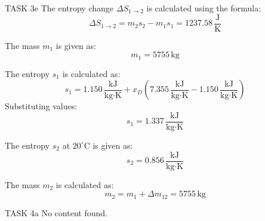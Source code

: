 TASK 3e  
The entropy change \( \Delta S_{1 \to 2} \) is calculated using the formula:  
\[
\Delta S_{1 \to 2} = m_2 s_2 - m_1 s_1 = 1237.58 \, \frac{\text{J}}{\text{K}}
\]

The mass \( m_1 \) is given as:  
\[
m_1 = 5755 \, \text{kg}
\]

The entropy \( s_1 \) is calculated as:  
\[
s_1 = 1.150 \, \frac{\text{kJ}}{\text{kg·K}} + x_D \left( 7.355 \, \frac{\text{kJ}}{\text{kg·K}} - 1.150 \, \frac{\text{kJ}}{\text{kg·K}} \right)
\]  
Substituting values:  
\[
s_1 = 1.337 \, \frac{\text{kJ}}{\text{kg·K}}
\]

The entropy \( s_2 \) at \( 20^\circ\text{C} \) is given as:  
\[
s_2 = 0.856 \, \frac{\text{kJ}}{\text{kg·K}}
\]

The mass \( m_2 \) is calculated as:  
\[
m_2 = m_1 + \Delta m_{12} = 5755 \, \text{kg}
\]

TASK 4a  
No content found.